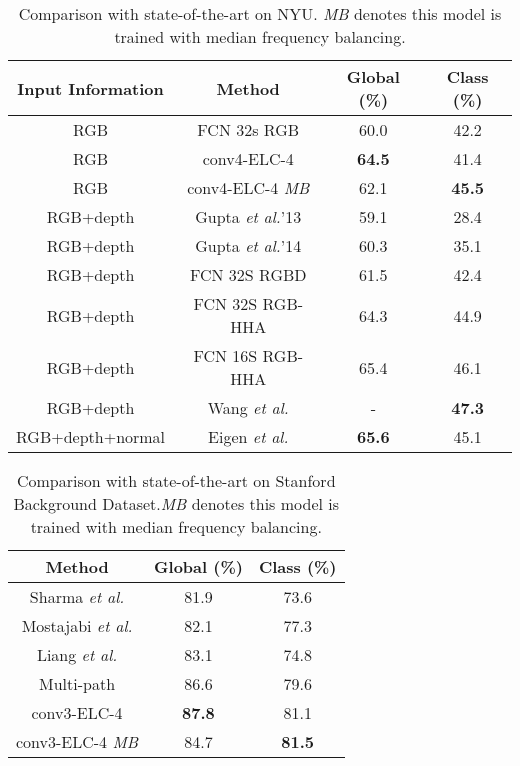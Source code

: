 \documentclass[10pt,twocolumn,letterpaper]{article}
\begin{document}
\begin{table*}
\begin{center}
\label{table:nyu}
\begin{tabular}{c|c|c|c}
\hline
 Input Information & Method &   Global (\%) & Class (\%)  \\
\hline\hline
RGB & FCN 32s RGB \cite{3} & 60.0 & 42.2\\
\rowcolor{Gray}
RGB & conv4-ELC-4 & \textbf{64.5} & 41.4 \\
\rowcolor{Gray}
RGB & conv4-ELC-4 \textit{MB}   & 62.1 & \textbf{45.5} \\
\hline
RGB+depth & Gupta \textit{et al.}'13 \cite{38}  & 59.1 & 28.4 \\
RGB+depth & Gupta \textit{et al.}'14 \cite{39}  & 60.3 & 35.1 \\
RGB+depth & FCN 32S RGBD \cite{3} & 61.5 & 42.4 \\
RGB+depth & FCN 32S RGB-HHA \cite{3} & 64.3 & 44.9 \\
\rowcolor{Gray}
RGB+depth & FCN 16S RGB-HHA \cite{3} & 65.4 & 46.1 \\
\rowcolor{Gray}
RGB+depth & Wang \textit{et al.} \cite{40} & - & \textbf{47.3} \\
\hline
\rowcolor{Gray}
RGB+depth+normal & Eigen \textit{et al.} \cite{2} & \textbf{65.6} & 45.1 \\
\hline
\end{tabular}
\end{center}
\caption{Comparison with state-of-the-art on NYU. \textit{MB} denotes this model is trained with median frequency balancing.}
\end{table*}




\begin{table}
\begin{center}
\label{table:st}
\begin{tabular}{c|c|c}
\hline
Method &   Global (\%) & Class (\%)  \\
\hline\hline
Sharma \textit{et al.}  \cite{42} & 81.9 & 73.6\\
Mostajabi \textit{et al.}  \cite{41} &  82.1  & 77.3\\
Liang  \textit{et al.} \cite{36} & 83.1 & 74.8 \\
Multi-path \cite{34}  & 86.6 & 79.6 \\
\hline
\rowcolor{Gray}
conv3-ELC-4 & \textbf{87.8} & 81.1 \\
\rowcolor{Gray}
conv3-ELC-4 \textit{MB}   & 84.7 & \textbf{81.5} \\
\hline
\end{tabular}
\end{center}
\caption{Comparison with state-of-the-art on Stanford Background Dataset.\textit{MB} denotes this model is trained with median frequency balancing.}
\end{table}
\end{document}
